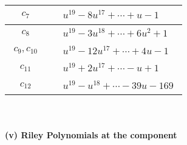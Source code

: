 \documentclass[1p]{elsarticle_modified}
\theoremstyle{definition}
\begin{document}
\begin{tabular}{m{50pt}|m{274pt}}
\hline $$\begin{aligned}c_{7}\end{aligned}$$&$\begin{aligned}
&u^{19}-8 u^{17}+\cdots+u-1
\end{aligned}$\\
\hline $$\begin{aligned}c_{8}\end{aligned}$$&$\begin{aligned}
&u^{19}-3 u^{18}+\cdots+6 u^2+1
\end{aligned}$\\
\hline $$\begin{aligned}c_{9},c_{10}\end{aligned}$$&$\begin{aligned}
&u^{19}-12 u^{17}+\cdots+4 u-1
\end{aligned}$\\
\hline $$\begin{aligned}c_{11}\end{aligned}$$&$\begin{aligned}
&u^{19}+2 u^{17}+\cdots- u+1
\end{aligned}$\\
\hline $$\begin{aligned}c_{12}\end{aligned}$$&$\begin{aligned}
&u^{19}- u^{18}+\cdots-39 u-169
\end{aligned}$\\
\hline
\end{tabular}\\~\\
\newpage\renewcommand{\arraystretch}{1}
\flushleft \textbf{(v) Riley Polynomials at the component}\newline \\
\end{document}
